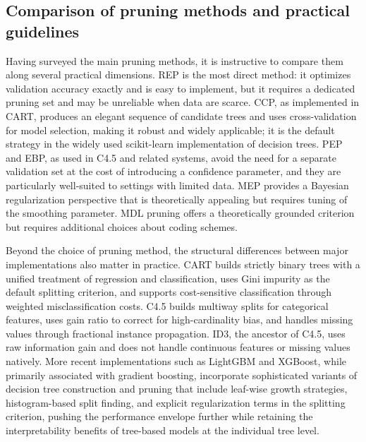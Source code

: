 \subsection*{Comparison of pruning methods and practical guidelines}

Having surveyed the main pruning methods, it is instructive to compare them along several
practical dimensions. REP is the most direct method: it optimizes validation accuracy
exactly and is easy to implement, but it requires a dedicated pruning set and may be
unreliable when data are scarce. CCP, as implemented in CART, produces an elegant sequence
of candidate trees and uses cross-validation for model selection, making it robust and
widely applicable; it is the default strategy in the widely used scikit-learn implementation
of decision trees. PEP and EBP, as used in C4.5 and related systems, avoid the need for a
separate validation set at the cost of introducing a confidence parameter, and they are
particularly well-suited to settings with limited data. MEP provides a Bayesian
regularization perspective that is theoretically appealing but requires tuning of the
smoothing parameter. MDL pruning offers a theoretically grounded criterion but requires
additional choices about coding schemes.

Beyond the choice of pruning method, the structural differences between major
implementations also matter in practice. CART builds strictly binary trees with a
unified treatment of regression and classification, uses Gini impurity as the default
splitting criterion, and supports cost-sensitive classification through weighted
misclassification costs. C4.5 builds multiway splits for categorical features, uses
gain ratio to correct for high-cardinality bias, and handles missing values through
fractional instance propagation. ID3, the ancestor of C4.5, uses raw information gain
and does not handle continuous features or missing values natively. More recent
implementations such as LightGBM and XGBoost, while primarily associated with gradient
boosting, incorporate sophisticated variants of decision tree construction and pruning that
include leaf-wise growth strategies, histogram-based split finding, and explicit
regularization terms in the splitting criterion, pushing the performance envelope further
while retaining the interpretability benefits of tree-based models at the individual tree
level.

